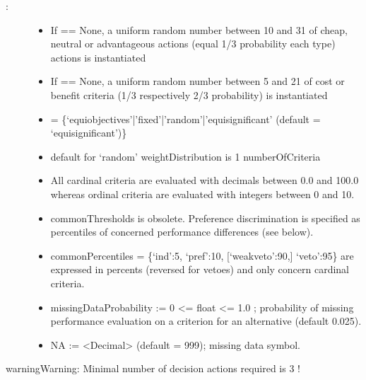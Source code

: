\documentclass[a4paper,12pt,english]{sphinxhowto}
\begin{document}
\begin{description}
\item[{:}] \leavevmode\begin{itemize}
\item {} 
If  == None, a uniform random number between 10 and 31 of cheap, neutral or advantageous actions (equal 1/3 probability each type) actions is instantiated

\item {} 
If  == None, a uniform random number between 5 and 21 of cost or benefit criteria (1/3 respectively 2/3 probability) is instantiated

\item {} 
 = \{‘equiobjectives’|’fixed’|’random’|’equisignificant’ (default = ‘equisignificant’)\}

\item {} 
default  for ‘random’ weightDistribution is 1 \sphinxhyphen{} numberOfCriteria

\item {} 
All cardinal criteria are evaluated with decimals between 0.0 and 100.0 whereas ordinal criteria are evaluated with integers between 0 and 10.

\item {} 
commonThresholds is obsolete. Preference discrimination is specified as percentiles of concerned performance differences (see below).

\item {} 
commonPercentiles = \{‘ind’:5, ‘pref’:10, {[}‘weakveto’:90,{]} ‘veto’:95\} are expressed in percents (reversed for vetoes) and only concern cardinal criteria.

\item {} 
missingDataProbability := 0 \textless{}= float \textless{}= 1.0 ; probability of missing performance evaluation on a criterion for an alternative (default 0.025).

\item {} 
NA := \textless{}Decimal\textgreater{} (default = \sphinxhyphen{}999); missing data symbol.

\end{itemize}

\end{description}

\begin{sphinxadmonition}{warning}{Warning:}
Minimal number of decision actions required is 3 !
\end{sphinxadmonition}
\end{document}
